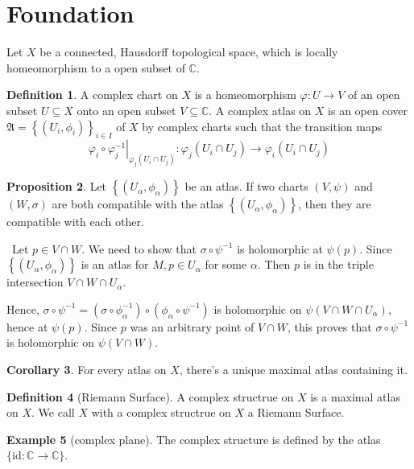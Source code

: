 \documentclass[12pt,a4paper]{book}
\newenvironment{prooff}{{\noindent\it\textcolor{cyan!40!black}{Proof}:}\,}{\par}
\newcommand{\bb}[1]{\mathbb{#1}}
\theoremstyle{definition}
\newtheorem{defn}{Definition}[section]
\newtheorem{coro}[defn]{Corollary}
\newtheorem{prop}[defn]{Proposition}
\newtheorem{exam}[defn]{Example}
\begin{document}
\section{Foundation}
Let $X$ be a connected, Hausdorff topological space, which is locally homeomorphism to a open subset of $\bb{C}$.
\begin{defn}
    A complex chart on $X$ is a homeomorphism $\varphi: U \rightarrow V$ of an open subset $U \subseteq X$ onto an open subset $V \subseteq \mathbb{C}$.
    A complex atlas on $X$ is an open cover $\mathfrak{A}=\left\{(U_i,\phi_i)\right\}_{i \in I}$ of $X$ by complex charts such that the transition maps
    $$
        \left.\varphi_i \circ \varphi_j^{-1}\right|_{\varphi_j\left(U_i \cap U_j\right)}: \varphi_j\left(U_i \cap U_j\right) \rightarrow \varphi_i\left(U_i \cap U_j\right)
    $$
\end{defn}
\begin{prop}
    Let $\left\{\left(U_\alpha, \phi_\alpha\right)\right\}$ be an atlas. If two charts $(V, \psi)$ and $(W, \sigma)$ are both compatible with the atlas $\left\{\left(U_\alpha, \phi_\alpha\right)\right\}$, then they are compatible with each other.
\end{prop}
\begin{prooff}
    Let $p \in V \cap W$. We need to show that $\sigma \circ \psi^{-1}$ is holomorphic at $\psi(p)$. Since $\left\{\left(U_\alpha, \phi_\alpha\right)\right\}$ is an atlas for $M, p \in U_\alpha$ for some $\alpha$. Then $p$ is in the triple intersection $V \cap W \cap U_\alpha$.

    Hence, $\sigma \circ \psi^{-1}=\left(\sigma \circ \phi_\alpha^{-1}\right) \circ\left(\phi_\alpha \circ \psi^{-1}\right)$ is holomorphic on $\psi\left(V \cap W \cap U_\alpha\right)$,
    hence at $\psi(p)$. Since $p$ was an arbitrary point of $V \cap W$, this proves that $\sigma \circ \psi^{-1}$ is holomorphic on $\psi(V \cap W)$.
\end{prooff}
\begin{coro}
    For every atlas on $X$, there's a unique maximal atlas containing it.
\end{coro}
\begin{defn}[Riemann Surface]
    A complex structrue on $X$ is a maximal atlas on $X$. We call $X$ with a complex structrue on $X$ a Riemann Surface.
\end{defn}
\begin{exam}[complex plane]
    The complex structure is defined by the atlas $\{\mathrm{id}: \mathbb{C} \rightarrow \mathbb{C}\}$.
\end{exam}
\end{document}

